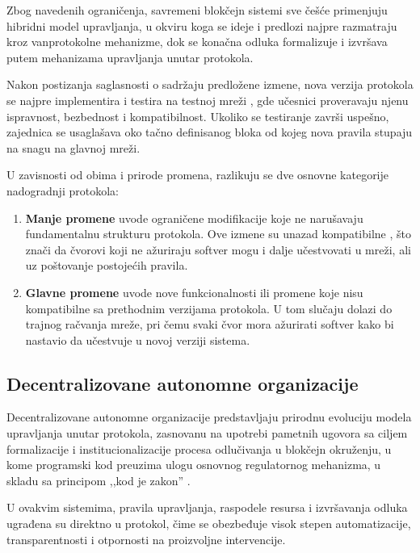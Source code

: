 Zbog navedenih ograničenja, savremeni blokčejn sistemi sve češće primenjuju hibridni model upravljanja, u okviru koga se ideje i predlozi najpre razmatraju kroz vanprotokolne mehanizme, dok se konačna odluka formalizuje i izvršava putem mehanizama upravljanja unutar protokola.

Nakon postizanja saglasnosti o sadržaju predložene izmene, nova verzija protokola se najpre implementira i testira na testnoj mreži , gde učesnici proveravaju njenu ispravnost, bezbednost i kompatibilnost. Ukoliko se testiranje završi uspešno, zajednica se usaglašava oko tačno definisanog bloka od kojeg nova pravila stupaju na snagu na glavnoj mreži.

U zavisnosti od obima i prirode promena, razlikuju se dve osnovne kategorije nadogradnji protokola:
\begin{enumerate}
\item \textbf{Manje promene } uvode ograničene modifikacije koje ne narušavaju fundamentalnu strukturu protokola. Ove izmene su unazad kompatibilne , što znači da čvorovi koji ne ažuriraju softver mogu i dalje učestvovati u mreži, ali uz poštovanje postojećih pravila.
\item \textbf{Glavne promene } uvode nove funkcionalnosti ili promene koje nisu kompatibilne sa prethodnim verzijama protokola. U tom slučaju dolazi do trajnog račvanja mreže, pri čemu svaki čvor mora ažurirati softver kako bi nastavio da učestvuje u novoj verziji sistema.
\end{enumerate}

\subsection{Decentralizovane autonomne organizacije}
Decentralizovane autonomne organizacije \cite{el2020overview}  predstavljaju prirodnu evoluciju modela upravljanja unutar protokola, zasnovanu na upotrebi pametnih ugovora sa ciljem formalizacije i institucionalizacije procesa odlučivanja u blokčejn okruženju, u kome programski kod preuzima ulogu osnovnog regulatornog mehanizma, u skladu sa principom ,,kod je zakon'' .

U ovakvim sistemima, pravila upravljanja, raspodele resursa i izvršavanja odluka ugrađena su direktno u protokol, čime se obezbeđuje visok stepen automatizacije, transparentnosti i otpornosti na proizvoljne intervencije.

